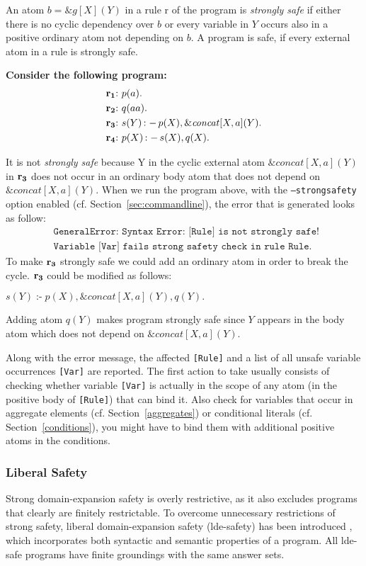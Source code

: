 \documentclass[a4paper, titlepage]{article}
\newcommand{\ext}[3]{\ensuremath{\&{\mathit{#1}}[#2](#3)}}
\DeclareMathOperator{\leftimpl}{:-}
\newcommand\mycenterline[1]{\par\smallskip\centerline{#1} \smallskip}
\newcommand{\row}[1]{%
  \ensuremath{\color{black}\ensuremath{\mathbf{#1}} \color{black}}%
}
\newcommand{\rowprefix}[1]{%
  \ensuremath{\color{black}\mathbf{#1{:}}\ }%
}
\begin{document}
An atom $b=\ext{g}{X}{Y}$ in a rule r of the program is \emph{strongly safe} if either there is no cyclic dependency over $b$   or every variable in $Y$ occurs also in a positive ordinary atom not depending on $b$. A program is safe, if every external atom in a rule is strongly safe. 


\begin{exmp} \textbf{Consider the following program:}
\label{strongSafetyExmp}
\begin{align*}
& \rowprefix{r_1} p(a). \\
& \rowprefix{r_2} q(aa). \\
& \rowprefix{r_3} s(Y) \leftimpl p(X), \ext{concat}{X,a}{Y}. \\
& \rowprefix{r_4} p(X) \leftimpl s(X), q(X).
\end{align*}
\end{exmp}
It is not \emph{strongly safe} because Y in the cyclic external atom $\ext{concat}{X,a}{Y}$ in $\row{r_3}$ does not occur in an
ordinary body atom that does not depend on 
\\$\ext{concat}{X,a}{Y}$. When we run the program above, with the \texttt{--strongsafety} option enabled (cf. Section~\ref{sec:commandline}), the error that is generated looks as follow:
\begin{align*}
& \texttt{GeneralError: Syntax Error: [Rule] is not strongly safe! }  \\
& \texttt{Variable [Var] fails strong safety check in rule Rule.}
\end{align*}
To make $\row{r_3}$ strongly safe we could add an ordinary atom in order to break the cycle. $\row{r_3}$ could be modified as follows:\mycenterline{$s(Y) \leftimpl p(X), \ext{concat}{X,a}{Y},q(Y).$} Adding atom $q(Y)$ makes program strongly safe since $Y$ appears in the body atom which does not depend on $\ext{concat}{X,a}{Y}$.
 
Along with the error message, the affected \texttt{[Rule]} and a list of all unsafe variable occurrences \texttt{[Var]} are reported. 
The first action to take usually consists of checking whether variable \texttt{[Var]} is actually in the scope of any atom (in the positive body of \texttt{[Rule]}) that can bind it. Also check for variables that occur in aggregate elements (cf. Section~\ref{aggregates}) or conditional literals (cf. Section~\ref{conditions}), you might have to bind them with additional positive atoms in the conditions. 



\subsubsection{Liberal Safety}
Strong domain-expansion safety is overly restrictive, as it also excludes programs that clearly are finitely
restrictable. To overcome unnecessary restrictions of strong safety, liberal domain-expansion safety (lde-safety)
has been introduced \cite{eite-etal-14a}, which incorporates both syntactic and semantic properties of a program. All lde-safe programs have finite groundings with the same answer sets.
\end{document}
